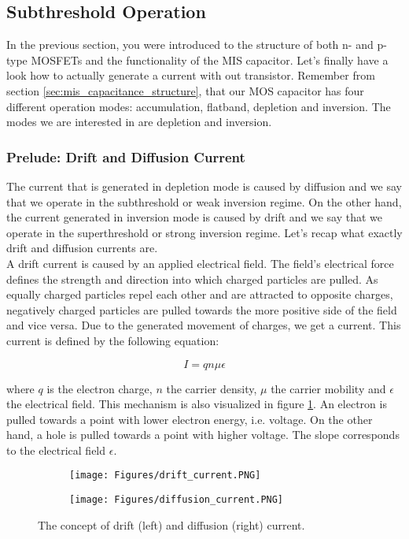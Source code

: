 \subsection{Subthreshold Operation}

In the previous section, you were introduced to the structure of both n- and p-type MOSFETs and the functionality of the MIS capacitor. Let's finally have a look how to actually generate a current with out transistor. Remember from section \ref{sec:mis_capacitance_structure}, that our MOS capacitor has four different operation modes: accumulation, flatband, depletion and inversion. The modes we are interested in are depletion and inversion. 

\subsubsection{Prelude: Drift and Diffusion Current}

The current that is generated in depletion mode is caused by diffusion and we say that we operate in the subthreshold or weak inversion regime. On the other hand, the current generated in inversion mode is caused by drift and we say that we operate in the superthreshold or strong inversion regime. Let's recap what exactly drift and diffusion currents are.\\

A drift current is caused by an applied electrical field. The field's electrical force defines the strength and direction into which charged particles are pulled. As equally charged particles repel each other and are attracted to opposite charges, negatively charged particles are pulled towards the more positive side of the field and vice versa. Due to the generated movement of charges, we get a current. This current is defined by the following equation:

\begin{equation}
    I = q n \mu \epsilon
\end{equation}

where $q$ is the electron charge, $n$ the carrier density, $\mu$ the carrier mobility and $\epsilon$ the electrical field. This mechanism is also visualized in figure \ref{fig:drift_current}. An electron is pulled towards a point with lower electron energy, i.e. voltage. On the other hand, a hole is pulled towards a point with higher voltage. The slope corresponds to the electrical field $\epsilon$.\\

\begin{figure}
\centering
\begin{subfigure}{0.5\textwidth}
  \centering
  \texttt{[image: Figures/drift\_current.PNG]}
  \label{fig:drift_current}
\end{subfigure}%
\begin{subfigure}{0.5\textwidth}
  \centering
  \texttt{[image: Figures/diffusion\_current.PNG]}
  \label{fig:diffusion_current}
\end{subfigure}
\caption{The concept of drift (left) and diffusion (right) current.}
\end{figure}


